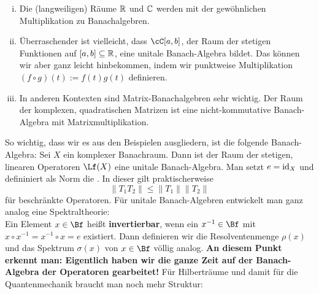 \begin{beispiele}
\begin{enumerate}[(i)]
\item Die (langweiligen) Räume $\mathbb{R}$ und $\mathbb{C}$ werden mit der gewöhnlichen Multiplikation zu Banachalgebren.
\item Überraschender ist vielleicht, dass $\cC[a,b]$, der Raum der stetigen Funktionen auf $[a,b] \subseteq \mathbb{R}$, eine unitale Banach-Algebra bildet. Das können wir aber ganz leicht hinbekommen, indem wir punktweise Multiplikation $(f \circ g)(t):=f(t)g(t)$ definieren.
\item In anderen Kontexten sind Matrix-Banachalgebren sehr wichtig. Der Raum der komplexen, quadratischen Matrizen ist eine nicht-kommutative Banach-Algebra mit Matrixmultiplikation.
\end{enumerate}
\end{beispiele}
So wichtig, dass wir es aus den Beispielen ausgliedern, ist die folgende Banach-Algebra:
Sei $X$ ein komplexer Banachraum. Dann ist der Raum der stetigen, linearen Operatoren $\Lf(X)$ eine unitale Banach-Algebra. Man setzt $e = \text{id}_X$ und defininiert als Norm die . In dieser gilt praktischerweise
\[ \| T_1 T_2 \| \leq \|T_1\| \|T_2\| \]
für beschränkte Operatoren. Für unitale Banach-Algebren entwickelt man ganz analog eine Spektraltheorie:\\
Ein Element $x \in \Bf$ heißt \textbf{invertierbar}, wenn ein $x^{-1} \in \Bf$ mit $x \circ x^{-1} = x^{-1} \circ x = e$ existiert. Dann definieren wir die Resolventenmenge $\rho(x)$ und das Spektrum $\sigma(x)$ von $x \in \Bf$ völlig analog. \textbf{An diesem Punkt erkennt man: Eigentlich haben wir die ganze Zeit auf der Banach-Algebra der Operatoren gearbeitet!} Für Hilberträume und damit für die Quantenmechanik braucht man noch mehr Struktur:

